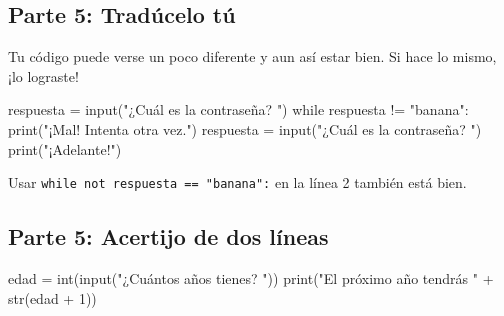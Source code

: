 \subsection*{Parte 5: Tradúcelo tú}
Tu código puede verse un poco diferente y aun así estar bien. Si hace lo mismo, ¡lo lograste!
\begin{codenonum}
respuesta = input("¿Cuál es la contraseña? ")
while respuesta != "banana":
    print("¡Mal! Intenta otra vez.")
    respuesta = input("¿Cuál es la contraseña? ")
print("¡Adelante!")
\end{codenonum}
Usar \texttt{while not respuesta == "banana":} en la línea 2 también está bien.

\subsection*{Parte 5: Acertijo de dos líneas}
\begin{codenonum}
edad = int(input("¿Cuántos años tienes? "))
print("El próximo año tendrás " + str(edad + 1))
\end{codenonum}
